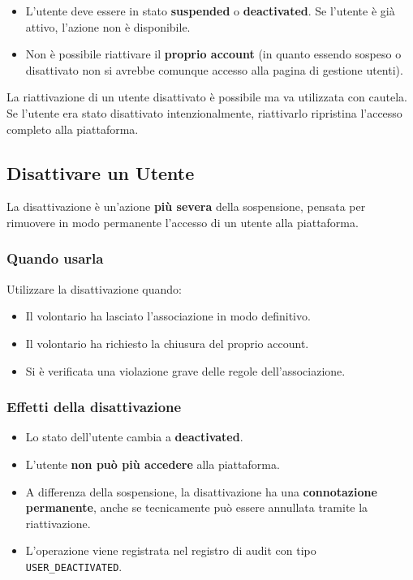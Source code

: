 \documentclass[a4paper,11pt,oneside]{book}
\begin{document}
\begin{itemize}[leftmargin=1.5em]
  \item L'utente deve essere in stato \textbf{suspended} o \textbf{deactivated}. Se l'utente \`e gi\`a attivo, l'azione non \`e disponibile.
  \item Non \`e possibile riattivare il \textbf{proprio account} (in quanto essendo sospeso o disattivato non si avrebbe comunque accesso alla pagina di gestione utenti).
\end{itemize}

\begin{infobox}
La riattivazione di un utente disattivato \`e possibile ma va utilizzata con cautela. Se l'utente era stato disattivato intenzionalmente, riattivarlo ripristina l'accesso completo alla piattaforma.
\end{infobox}

\subsection{Disattivare un Utente}
\label{sec:disattivare-utente}

La disattivazione \`e un'azione \textbf{pi\`u severa} della sospensione, pensata per rimuovere in modo permanente l'accesso di un utente alla piattaforma.

\subsubsection{Quando usarla}

Utilizzare la disattivazione quando:

\begin{itemize}[leftmargin=1.5em]
  \item Il volontario ha lasciato l'associazione in modo definitivo.
  \item Il volontario ha richiesto la chiusura del proprio account.
  \item Si \`e verificata una violazione grave delle regole dell'associazione.
\end{itemize}

\subsubsection{Effetti della disattivazione}

\begin{itemize}[leftmargin=1.5em]
  \item Lo stato dell'utente cambia a \textbf{deactivated}.
  \item L'utente \textbf{non pu\`o pi\`u accedere} alla piattaforma.
  \item A differenza della sospensione, la disattivazione ha una \textbf{connotazione permanente}, anche se tecnicamente pu\`o essere annullata tramite la riattivazione.
  \item L'operazione viene registrata nel registro di audit con tipo \texttt{USER\_DEACTIVATED}.
\end{itemize}
\end{document}

